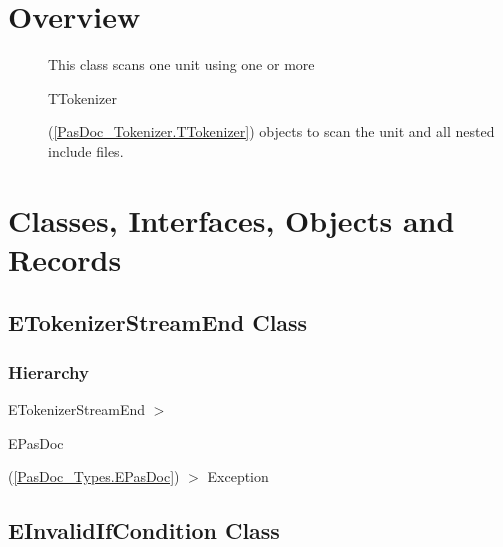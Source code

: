 \documentclass{report}
\newif\ifpdf
\begin{document}
\section{Overview}
\begin{description}
\item[\texttt{\begin{ttfamily}ETokenizerStreamEnd\end{ttfamily} Class}]
\item[\texttt{\begin{ttfamily}EInvalidIfCondition\end{ttfamily} Class}]
\item[\texttt{\begin{ttfamily}TScanner\end{ttfamily} Class}]This class scans one unit using one or more \begin{ttfamily}TTokenizer\end{ttfamily}(\ref{PasDoc_Tokenizer.TTokenizer}) objects to scan the unit and all nested include files.
\end{description}
\section{Classes, Interfaces, Objects and Records}
\ifpdf
\subsection*{\large{\textbf{ETokenizerStreamEnd Class}}\normalsize\hspace{1ex}\hrulefill}
\else
\subsection*{ETokenizerStreamEnd Class}
\fi
\label{PasDoc_Scanner.ETokenizerStreamEnd}
\subsubsection*{\large{\textbf{Hierarchy}}\normalsize\hspace{1ex}\hfill}
ETokenizerStreamEnd {$>$} \begin{ttfamily}EPasDoc\end{ttfamily}(\ref{PasDoc_Types.EPasDoc}) {$>$} 
Exception
\ifpdf
\subsection*{\large{\textbf{EInvalidIfCondition Class}}\normalsize\hspace{1ex}\hrulefill}
\else
\end{document}
